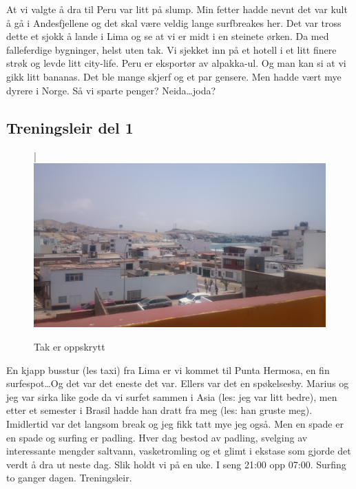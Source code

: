 At vi valgte å dra til Peru var litt på slump. Min fetter hadde nevnt
det var kult å gå i Andesfjellene og det skal være veldig lange
surfbreakes her. Det var tross dette et sjokk å lande i Lima og se at
vi er midt i en steinete ørken. Da med falleferdige bygninger, helst
uten tak. Vi sjekket inn på et hotell i et litt finere strøk og levde
litt city-life. Peru er eksportør av alpakka-ul. Og man kan si at vi
gikk litt bananas. Det ble mange skjerf og et par gensere. Men hadde
vært mye dyrere i Norge. Så vi sparte penger? Neida\ldots joda?
\clearpage

\subsection*{Treningsleir del 1}


\begin{figure}[!h]
	\centering
|\includegraphics[width=\textwidth]{takeroppskrytt}
	\caption{Tak er oppskrytt}
\label{fig:takeropskrytt}
\end{figure}
En kjapp busstur (les taxi) fra Lima er vi kommet til Punta Hermosa,
en fin surfespot\ldots Og det var det eneste det var. Ellers var det en
spøkelsesby. Marius og jeg var sirka like gode da vi
surfet sammen i Asia (les: jeg var litt bedre), men etter et semester i Brasil hadde han dratt
fra meg (les: han gruste meg). Imidlertid var det langsom break og jeg fikk tatt
mye jeg også. Men en spade er en spade og surfing er padling. Hver dag
bestod av padling,
svelging av interessante mengder saltvann, vasketromling og et glimt
i ekstase som gjorde det verdt å dra ut neste dag. Slik holdt vi på en
uke. I seng 21:00 opp 07:00. Surfing to ganger dagen. Treningsleir.\\



